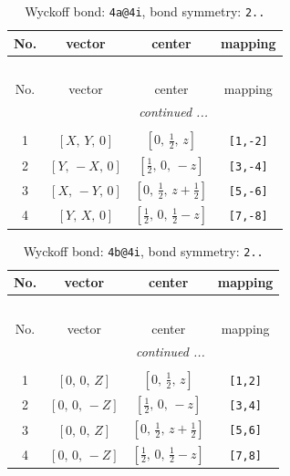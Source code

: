 \documentclass[fleqn,8pt]{jsarticle}
\begin{document}
\begin{longtable}{cccc}
\caption{Wyckoff bond: {\tt 4a@4i}, bond symmetry: {\tt 2..}}
 \\
 \hline \hline
No. & vector & center & mapping \\ \hline \endfirsthead

\multicolumn{3}{l}{\tablename\ \thetable{}} \\
 \hline \hline
No. & vector & center & mapping \\ \hline \endhead

 \hline \hline
\multicolumn{3}{r}{\footnotesize\it continued ...} \\ \endfoot

 \hline \hline
\multicolumn{3}{r}{} \\ \endlastfoot

1 & $\left[ X,\, Y,\, 0 \right]$ & $\left[ 0,\, \frac{1}{2},\, z \right]$ & {\tt [1,-2]} \\ \hline
2 & $\left[ Y,\, - X,\, 0 \right]$ & $\left[ \frac{1}{2},\, 0,\, - z \right]$ & {\tt [3,-4]} \\ \hline
3 & $\left[ X,\, - Y,\, 0 \right]$ & $\left[ 0,\, \frac{1}{2},\, z + \frac{1}{2} \right]$ & {\tt [5,-6]} \\ \hline
4 & $\left[ Y,\, X,\, 0 \right]$ & $\left[ \frac{1}{2},\, 0,\, \frac{1}{2} - z \right]$ & {\tt [7,-8]} \\
\end{longtable}
\renewcommand{\arraystretch}{1.2}
\begin{longtable}{cccc}
\caption{Wyckoff bond: {\tt 4b@4i}, bond symmetry: {\tt 2..}}
 \\
 \hline \hline
No. & vector & center & mapping \\ \hline \endfirsthead

\multicolumn{3}{l}{\tablename\ \thetable{}} \\
 \hline \hline
No. & vector & center & mapping \\ \hline \endhead

 \hline \hline
\multicolumn{3}{r}{\footnotesize\it continued ...} \\ \endfoot

 \hline \hline
\multicolumn{3}{r}{} \\ \endlastfoot

1 & $\left[ 0,\, 0,\, Z \right]$ & $\left[ 0,\, \frac{1}{2},\, z \right]$ & {\tt [1,2]} \\ \hline
2 & $\left[ 0,\, 0,\, - Z \right]$ & $\left[ \frac{1}{2},\, 0,\, - z \right]$ & {\tt [3,4]} \\ \hline
3 & $\left[ 0,\, 0,\, Z \right]$ & $\left[ 0,\, \frac{1}{2},\, z + \frac{1}{2} \right]$ & {\tt [5,6]} \\ \hline
4 & $\left[ 0,\, 0,\, - Z \right]$ & $\left[ \frac{1}{2},\, 0,\, \frac{1}{2} - z \right]$ & {\tt [7,8]} \\
\end{longtable}
\end{document}
